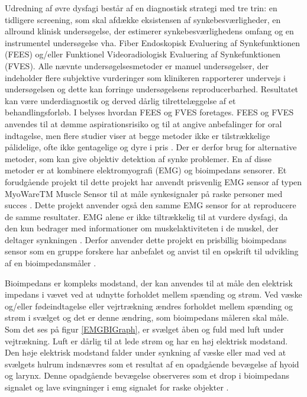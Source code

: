   Udredning af øvre dysfagi består af en diagnostisk strategi med tre trin: en tidligere screening, som skal afdække eksistensen af synkebesværligheder, en allround klinisk undersøgelse, der estimerer synkebesværlighedens omfang og en instrumentel undersøgelse vha. Fiber Endoskopisk Evaluering af Synkefunktionen (FEES) og/eller Funktionel Videoradiologisk Evaluering af Synkefunktionen (FVES). Alle nævnte undersøgelsesmetoder er manuel undersøgelser, der indeholder flere subjektive vurderinger som klinikeren rapporterer undervejs i undersøgelsen og dette kan forringe undersøgelsens reproducerbarhed. Resultatet kan være underdiagnostik og derved dårlig tilrettelæggelse af et behandlingsforløb. I  belyses hvordan FEES og FVES foretages. FEES og FVES anvendes til at dømme aspirationsrisiko og til at angive anbefalinger for oral indtagelse, men flere studier viser at begge metoder ikke er tilstrækkelige pålidelige,  ofte ikke gentagelige og dyre i pris \cite{Kelly2006} \cite{McCullough2001Inter-Measures} \cite{Schultheiss2014} \cite{Nahrstaedt2012SwallowMeasurements}.  Der er derfor brug for alternative metoder, som kan give objektiv detektion af synke problemer. En af disse metoder er at kombinere elektromyografi (EMG) og bioimpedans sensorer. Et forudgående projekt til dette projekt har anvendt prisvenlig EMG sensor af typen MyoWareTM Muscle Sensor til at måle synkesignaler på raske personer med succes \cite[s. 58]{ChristensenElisabethLundbakStrand2017}. Dette projekt anvender også den samme EMG sensor for at reproducere de samme resultater. EMG alene er ikke tiltrækkelig til at vurdere dysfagi, da den kun bedrager med informationer om muskelaktiviteten i de muskel, der deltager synkningen \cite{Schultheiss2014}. Derfor anvender dette projekt en prisbillig bioimpedans sensor som en gruppe forskere har anbefalet og anvist til en opskrift til udvikling af en bioimpedansmåler \cite{Aroom2009}.

Bioimpedans er kompleks modstand, der kan anvendes til at måle den elektrisk impedans i vævet ved at udnytte forholdet mellem spænding og strøm. Ved væske og/eller fødeindtagelse eller vejrtrækning ændres forholdet mellem spænding og strøm i svælget og det er denne ændring, som bioimpedans måleren skal måle. Som det ses på figur \ref{EMGBIGraph}, er svælget åben og fuld med luft under vejtrækning. Luft er dårlig til at lede strøm og har en høj elektrisk modstand. Den høje elektrisk modstand falder under synkning af væske eller mad ved at svælgets hulrum indsnævres som et resultat af en opadgående bevægelse af hyoid og larynx. Denne opadgående bevægelse observeres som et drop i bioimpedans signalet og lave svingninger i emg signalet for raske objekter \cite{Schultheiss2014}.          



